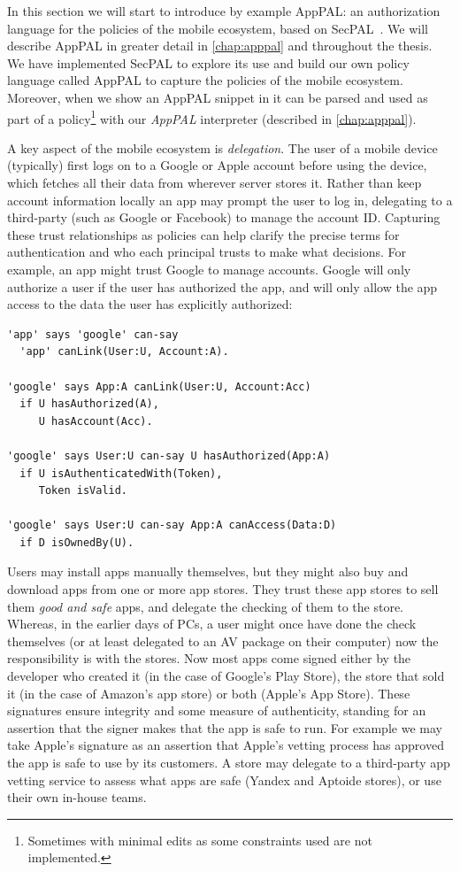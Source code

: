 \documentclass[thesis.tex]{subfiles}
\begin{document}
In this section we will start to introduce by example AppPAL: an authorization language for
the policies of the mobile ecosystem, based on SecPAL~\cite{becker_secpal:_2006}. We will describe AppPAL in greater detail
in \autoref{chap:apppal} and throughout the thesis. 
We have implemented SecPAL to explore its use and build our own policy language called AppPAL to capture the policies
of the mobile ecosystem. Moreover, when we show an AppPAL
snippet in  it can be parsed
and used as part of a policy\footnote{Sometimes with minimal edits as some constraints used are not
implemented.} with our \emph{AppPAL} interpreter (described in \autoref{chap:apppal}).


A key aspect of the mobile ecosystem is \emph{delegation}. The user of a mobile
device (typically) first logs on to a Google or Apple account before using the
device, which fetches all their data from wherever server stores it. Rather than
keep account information locally an app may prompt the user to log in,
delegating to a third-party (such as Google or Facebook) to manage the account
ID. Capturing these trust relationships as policies can help clarify the precise
terms for authentication and who each principal trusts to make what decisions.
For example, an app might trust Google to manage accounts. Google will only
authorize a user if the user has authorized the app, and will only allow the app
access to the data the user has explicitly authorized:
\begin{lstlisting}
'app' says 'google' can-say 
  'app' canLink(User:U, Account:A).

'google' says App:A canLink(User:U, Account:Acc)
  if U hasAuthorized(A),
     U hasAccount(Acc).

'google' says User:U can-say U hasAuthorized(App:A)
  if U isAuthenticatedWith(Token),
     Token isValid.

'google' says User:U can-say App:A canAccess(Data:D)
  if D isOwnedBy(U).
\end{lstlisting}

Users may install apps manually themselves, but they might also buy and download
apps from one or more app stores. They trust these app stores to sell them
\emph{good and safe} apps, and delegate the checking of them to the store.
Whereas, in the earlier days of PCs, a user might once have done the check
themselves (or at least delegated to an \ac{AV} package on their computer) now
the responsibility is with the stores. Now most apps come signed either by the
developer who created it (in the case of Google's Play Store), the store that
sold it (in the case of Amazon's app store) or both (Apple's App Store). These
signatures ensure integrity and some measure of authenticity, standing for an
assertion that the signer makes that the app is safe to run. For example we may
take Apple's signature as an assertion that Apple's vetting process has approved
the app is safe to use by its customers. A store may delegate to a third-party
app vetting service to assess what apps are safe (Yandex and Aptoide stores), or
use their own in-house teams.
\end{document}

